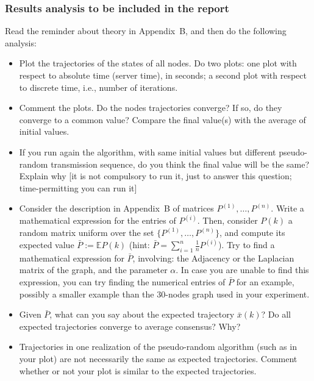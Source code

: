 \documentclass[oneside]{article}
\begin{document}
\subsubsection{Results analysis to be included in the report}
Read the reminder about theory in Appendix~B, and then do the following analysis:
\begin{itemize}
\item Plot the trajectories of the states of all nodes. Do two plots: one plot with respect to absolute time (server time), in seconds; a second plot with respect to discrete time, i.e., number of iterations.
\item Comment the plots. Do the nodes trajectories converge? If so, do they converge to a common value? Compare the final value(s) with the average of initial values.
\item  If you run again the algorithm, with same initial values but different pseudo-random transmission sequence, do you think the final value will be the same? Explain why [it is not compulsory to run it, just to answer this question; time-permitting you can run it]
\item Consider the description in Appendix~B of matrices $P^{(1)}, \dots, P^{(n)} $. Write a mathematical expression for the entries of $P^{(i)}$. Then, consider $P(k)$ a random matrix uniform over the set $\{P^{(1)}, \dots, P^{(n)}\}$, and compute its expected value $\bar P := \mathbb E P(k)$ (hint: $\bar P = \sum_{i=1}^n \frac{1}{n} P^{(i)}$).
Try to find a mathematical expression for $\bar P$, involving: the Adjacency or the Laplacian matrix of the graph, and the parameter $\alpha$.
In case you are unable to find this expression, you can try finding the numerical entries of $\bar P$ for an example, possibly a smaller example than the 30-nodes graph used in your experiment.
\item Given $\bar P$, what can you say about the expected trajectory $\bar x(k)$? Do all expected trajectories converge to average consensus? Why?
\item Trajectories in one realization of the pseudo-random algorithm (such as in your plot) are not necessarily the same as expected trajectories. Comment whether or not your plot is similar to the expected trajectories.
\end{itemize}
\end{document}

